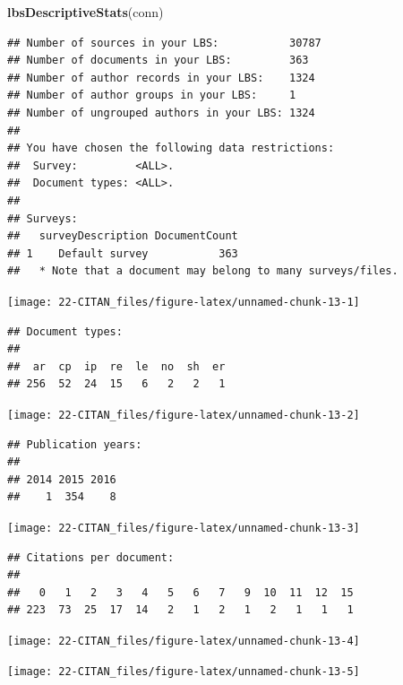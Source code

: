 \documentclass[
]{book}
\newenvironment{Shaded}{\begin{snugshade}}{\end{snugshade}}
\newcommand{\FunctionTok}[1]{\textcolor[rgb]{0.13,0.29,0.53}{\textbf{#1}}}
\newcommand{\NormalTok}[1]{#1}
\begin{document}
\begin{Shaded}
\begin{Highlighting}[]
\FunctionTok{lbsDescriptiveStats}\NormalTok{(conn)}
\end{Highlighting}
\end{Shaded}

\begin{verbatim}
## Number of sources in your LBS:           30787
## Number of documents in your LBS:         363
## Number of author records in your LBS:    1324
## Number of author groups in your LBS:     1
## Number of ungrouped authors in your LBS: 1324
## 
## You have chosen the following data restrictions:
##  Survey:         <ALL>.
##  Document types: <ALL>.
## 
## Surveys:
##   surveyDescription DocumentCount
## 1    Default survey           363
##   * Note that a document may belong to many surveys/files.
\end{verbatim}

\begin{center}\texttt{[image: 22-CITAN\_files/figure-latex/unnamed-chunk-13-1]} \end{center}

\begin{verbatim}
## Document types:
## 
##  ar  cp  ip  re  le  no  sh  er 
## 256  52  24  15   6   2   2   1
\end{verbatim}

\begin{center}\texttt{[image: 22-CITAN\_files/figure-latex/unnamed-chunk-13-2]} \end{center}

\begin{verbatim}
## Publication years:
## 
## 2014 2015 2016 
##    1  354    8
\end{verbatim}

\begin{center}\texttt{[image: 22-CITAN\_files/figure-latex/unnamed-chunk-13-3]} \end{center}

\begin{verbatim}
## Citations per document:
## 
##   0   1   2   3   4   5   6   7   9  10  11  12  15 
## 223  73  25  17  14   2   1   2   1   2   1   1   1
\end{verbatim}

\begin{center}\texttt{[image: 22-CITAN\_files/figure-latex/unnamed-chunk-13-4]} \end{center}

\begin{center}\texttt{[image: 22-CITAN\_files/figure-latex/unnamed-chunk-13-5]} \end{center}
\end{document}
